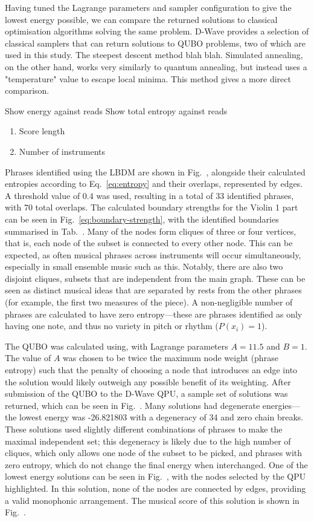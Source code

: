 \documentclass[12pt]{article}
\theoremstyle{definition}
\begin{document}
Having tuned the Lagrange parameters and sampler configuration to give the lowest energy possible, we can compare the returned solutions to classical optimisation algorithms solving the same problem. D-Wave provides a selection of classical samplers that can return solutions to QUBO problems, two of which are used in this study. The steepest descent method blah blah. Simulated annealing, on the other hand, works very similarly to quantum annealing, but instead uses a "temperature" value to escape local minima. This method gives a more direct comparison.

Show energy against reads
Show total entropy against reads

\begin{enumerate}
    \item Score length
    \item Number of instruments
\end{enumerate}

Phrases identified using the LBDM are shown in Fig.\  , alongside their calculated entropies according to Eq.\ \ref{eq:entropy} and their overlaps, represented by edges. A threshold value of $0.4$ was used, resulting in a total of 33 identified phrases, with 70 total overlaps. The calculated boundary strengths for the Violin 1 part can be seen in Fig.\ \ref{eq:boundary-strength}, with the identified boundaries summarised in Tab.\ . Many of the nodes form cliques of three or four vertices, that is, each node of the subset is connected to every other node. This can be expected, as often musical phrases across instruments will occur simultaneously, especially in small ensemble music such as this. Notably, there are also two disjoint cliques, subsets that are independent from the main graph. These can be seen as distinct musical ideas that are separated by rests from the other phrases (for example, the first two measures of the piece). A non-negligible number of phrases are calculated to have zero entropy—these are phrases identified as only having one note, and thus no variety in pitch or rhythm ($P(x_i)=1$).

The QUBO was calculated using, with Lagrange parameters $A=11.5$ and $B=1$. The value of $A$ was chosen to be twice the maximum node weight (phrase entropy) such that the penalty of choosing a node that introduces an edge into the solution would likely outweigh any possible benefit of its weighting. After submission of the QUBO to the D-Wave QPU, a sample set of solutions was returned, which can be seen in Fig.\  . Many solutions had degenerate energies—the lowest energy was -26.821803 with a degeneracy of 34 and zero chain breaks. These solutions used slightly different combinations of phrases to make the maximal independent set; this degeneracy is likely due to the high number of cliques, which only allows one node of the subset to be picked, and phrases with zero entropy, which do not change the final energy when interchanged. One of the lowest energy solutions can be seen in Fig.\  , with the nodes selected by the QPU highlighted. In this solution, none of the nodes are connected by edges, providing a valid monophonic arrangement. The musical score of this solution is shown in Fig.\  .
\end{document}
